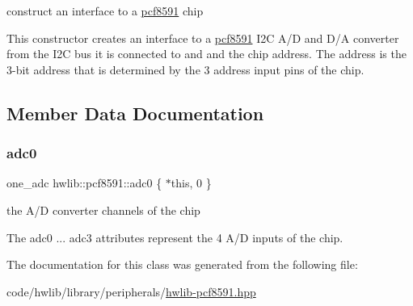 construct an interface to a \hyperlink{classhwlib_1_1pcf8591}{pcf8591} chip

This constructor creates an interface to a \hyperlink{classhwlib_1_1pcf8591}{pcf8591} I2C A/D and D/A converter from the I2C bus it is connected to and and the chip address. The address is the 3-\/bit address that is determined by the 3 address input pins of the chip. 

\subsection{Member Data Documentation}
\mbox{\label{classhwlib_1_1pcf8591_a29a87f5711fbbd85ed5c477a5eab1b6f}} 
\subsubsection{\texorpdfstring{adc0}{adc0}}
{\footnotesize\ttfamily one\+\_\+adc hwlib\+::pcf8591\+::adc0 \{ $\ast$this, 0 \}}

the A/D converter channels of the chip

The adc0 ... adc3 attributes represent the 4 A/D inputs of the chip. 

The documentation for this class was generated from the following file\+:\begin{DoxyCompactItemize}
\item 
code/hwlib/library/peripherals/\hyperlink{hwlib-pcf8591_8hpp}{hwlib-\/pcf8591.\+hpp}\end{DoxyCompactItemize}
